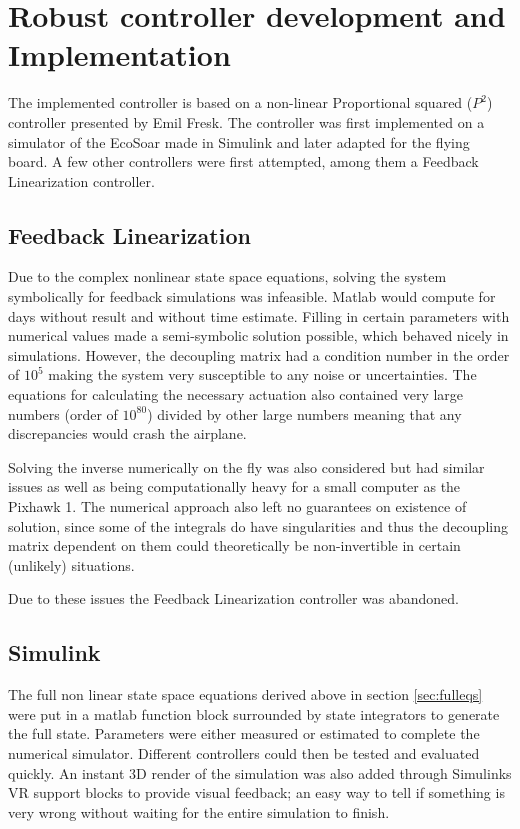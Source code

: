 \documentclass{article}
\begin{document}
\section{\textbf{Robust controller development and Implementation}}

The implemented controller is based on a non-linear Proportional squared ($P^2$) controller presented by Emil Fresk\cite{P2}.
The controller was first implemented on a simulator of the EcoSoar made in Simulink and later adapted for the flying board.
A few other controllers were first attempted, among them a Feedback Linearization controller.

\subsection{Feedback Linearization}
Due to the complex nonlinear state space equations, solving the system symbolically for feedback simulations was infeasible.
Matlab would compute for days without result and without time estimate.
Filling in certain parameters with numerical values made a semi-symbolic solution possible, which behaved nicely in simulations.
However, the decoupling matrix had a condition number in the order of $10^5$ making the system very susceptible to any noise or uncertainties.
The equations for calculating the necessary actuation also contained very large numbers (order of $10^{80}$) divided by other large numbers meaning that any discrepancies would crash the airplane.

Solving the inverse numerically on the fly was also considered but had similar issues as well as being computationally heavy for a small computer as the Pixhawk 1.
The numerical approach also left no guarantees on existence of solution, since some of the integrals do have singularities and thus the decoupling matrix dependent on them could theoretically be non-invertible in certain (unlikely) situations.

Due to these issues the Feedback Linearization controller was abandoned.


\subsection{Simulink}
The full non linear state space equations derived above in section \ref{sec:fulleqs} were put in a matlab function block surrounded by state integrators to generate the full state.
Parameters were either measured or estimated to complete the numerical simulator.
Different controllers could then be tested and evaluated quickly.
An instant 3D render of the simulation was also added through Simulinks VR support blocks to provide visual feedback; an easy way to tell if something is very wrong without waiting for the entire simulation to finish.
\end{document}
